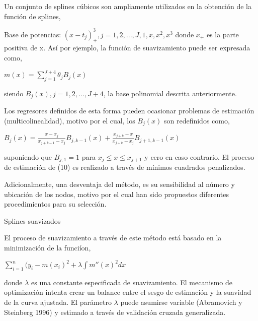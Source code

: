 \hspace*{0.4 cm} Un conjunto de splines c\'ubicos son ampliamente utilizados en la obtenci\'on de la funci\'on de splines,

\hspace*{0.4 cm} Base de potencias:  $(x- t_{j})_{+}^{3}, j= 1,2,...,J,1,x,x^2,x^3$ donde $x_{+}$ es la parte positiva de x. As\'i por ejemplo, la funci\'on de suavizamiento puede ser expresada como,

\begin{center}
$\displaystyle{ m(x) = \sum_{j=1}^{J+4} \theta_{j}B_{j}(x) }$
\end{center}

\noindent siendo $B_{j}(x), j = 1, 2,... , J+4$, la base polinomial descrita anteriormente.

\hspace*{0.4 cm} Los regresores definidos de esta forma pueden ocasionar problemas de estimaci\'on (multicolinealidad), motivo por el cual, los $B_{j}(x)$ son
redefinidos como,

\begin{center}
$\displaystyle{ B_{j}(x) = \frac{x-x_{j}}{x_{j+k-1}-x_{j}} B_{j,k-1}(x) + \frac{x_{j+k}-x}{x_{j+k}-x_{j}} B_{j+1,k-1}(x) }$
\end{center}


\noindent suponiendo que $B_{j,1}=1$ para $x_{j} \leq x \leq x_{j+1}$ y cero en caso contrario. El proceso de estimaci\'on de (10) es realizado a trav\'es de m\'inimos cuadrados penalizados.

\hspace*{0.4 cm}Adicionalmente, una desventaja del m\'etodo, es su sensibilidad al n\'umero y ubicaci\'on de los nodos, motivo por el cual han sido propuestos diferentes procedimientos para su selecci\'on.


Splines suavizados

\hspace*{0.4 cm}El proceso de suavizamiento a trav\'es de este m\'etodo est\'a basado en la minimizaci\'on de la funci\'ion,

\begin{center}
$\displaystyle{ \sum_{i=1}^{n} (y_{i}-m(x_{i})^2 + \lambda \int m''(x)^2dx  }$
\end{center}


\noindent donde $\lambda$ es una constante especificada de suavizamiento. El mecanismo de optimizaci\'on intenta crear un balance entre el sesgo de estimaci\'on y la suavidad de la curva ajustada. El par\'ametro $\lambda$ puede asumirse variable (Abramovich y Steinberg 1996) y estimado a trav\'es de validaci\'on cruzada generalizada.


